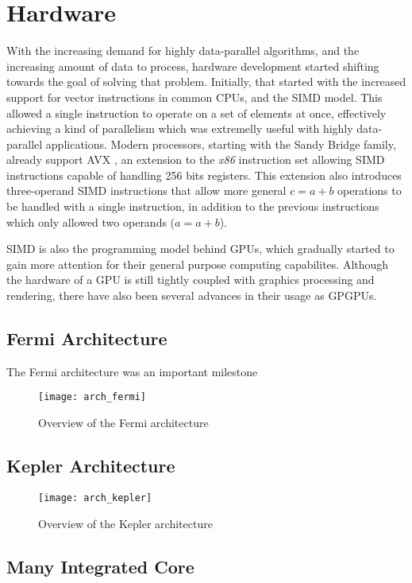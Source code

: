 \documentclass[main.tex]{subfiles}
\begin{document}
\section{Hardware}

With the increasing demand for highly data-parallel algorithms, and the increasing amount of data to process, hardware development started shifting towards the goal of solving that problem. Initially, that started with the increased support for vector instructions in common \acsp{CPU}, and the \acs{SIMD} model. This allowed a single instruction to operate on a set of elements at once, effectively achieving a kind of parallelism which was extremelly useful with highly data-parallel applications. Modern \intel processors, starting with the Sandy Bridge family, already support \ac{AVX} , an extension to the \textit{x86} instruction set allowing \acs{SIMD} instructions capable of handling 256 bits registers. This extension also introduces three-operand \acs{SIMD} instructions that allow more general $c = a + b$ operations to be handled with a single instruction, in addition to the previous instructions which only allowed two operands ($a = a + b$).

\acs{SIMD} is also the programming model behind \acsp{GPU}, which gradually started to gain more attention for their general purpose computing capabilites. Although the hardware of a \acs{GPU} is still tightly coupled with graphics processing and rendering, there have also been several advances in their usage as \acp{GPGPU}.



\subsection{\nvidia Fermi Architecture}

The Fermi architecture was an important milestone

\begin{figure}
  \centering
  \texttt{[image: arch\_fermi]}
  \caption{Overview of the Fermi architecture \label{fig:fermi}}
\end{figure}



\subsection{\nvidia Kepler Architecture}

\begin{figure}
  \centering
  \texttt{[image: arch\_kepler]}
  \caption{Overview of the Kepler architecture \label{fig:kepler}}
\end{figure}



\subsection{\intel Many Integrated Core}
\end{document}
